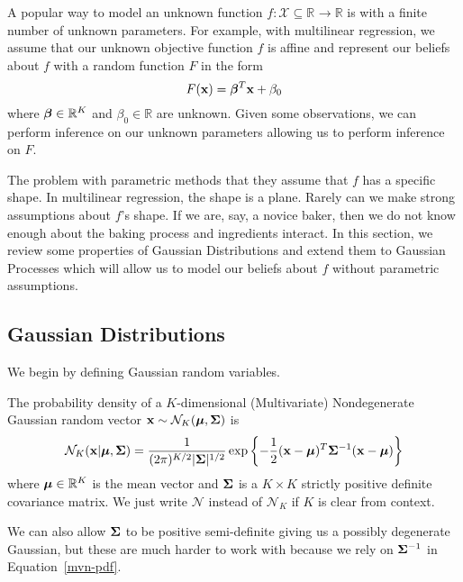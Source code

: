 A popular way to model an unknown function $f: \mathcal{X} \subseteq \mathbb{R}^{} \to \mathbb{R}$
is with a finite number of unknown parameters.
For example, with multilinear regression,
we assume that our unknown objective function $f$ is affine and represent our beliefs about $f$ with a random function $F$ in the form
\begin{equation*}
    F(\mathbf{x}) = \boldsymbol{\beta}^{T} \mathbf{x} + \beta_0
\end{equation*}
where $\boldsymbol{\beta} \in \mathbb{R}^{K}$ and $\beta_0 \in \mathbb{R}$ are unknown.
Given some observations, we can perform inference on our unknown parameters
allowing us
to perform inference on $F$.

The problem with parametric methods that they assume that $f$ has a specific shape.
In multilinear regression, the shape is a plane.
Rarely can we make strong assumptions about $f$'s shape.
If we are, say, a novice baker, then we do not know enough about the baking process and ingredients interact.
In this section, we review some properties of Gaussian Distributions and extend them to Gaussian Processes which will allow us to model our beliefs about $f$ without parametric assumptions.

\subsection{Gaussian Distributions}\label{ssec:gaus}

We begin by defining Gaussian random variables.
\begin{definition}
    The probability density of a $K$-dimensional (Multivariate) Nondegenerate Gaussian random vector $\mathbf{x} \sim \mathcal{N}_K(\boldsymbol{\mu}, \boldsymbol{\Sigma})$
    is
    \begin{equation}
        \label{eq:mvn-pdf}
        \mathcal{N}_K(\mathbf{x} | \boldsymbol{\mu}, \boldsymbol{\Sigma}) = \frac{ 1 }{ (2 \pi)^{K/2} \lvert \boldsymbol{\Sigma} \rvert^{1/2} } \exp \left\{ -\frac12 (\mathbf{x} - \boldsymbol{\mu})^{T} \boldsymbol{\Sigma}^{-1} (\mathbf{x} - \boldsymbol{\mu})  \right\}
    \end{equation}
    where $\boldsymbol{\mu} \in \mathbb{R}^{K}$ is the mean vector and $\boldsymbol{\Sigma}$ is a $K \times K$ strictly positive definite covariance matrix.
    We just write $\mathcal{N}$ instead of $\mathcal{N}_K$ if $K$ is clear from context.
\end{definition}
We can also allow $\boldsymbol{\Sigma}$ to be positive semi-definite giving us a possibly degenerate Gaussian, but these are much harder to work with because we rely on $\boldsymbol{\Sigma}^{-1}$ in Equation~\ref{mvn-pdf}.

